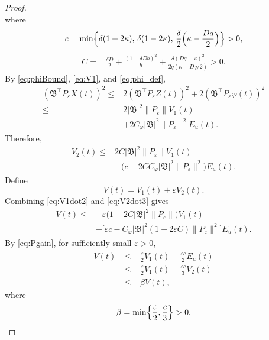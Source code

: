 \documentclass{IEEEtran}
\theoremstyle{definition}
\begin{document}
\begin{proof}
\begin{equation}
\label{eq:V2dot2}
\end{equation}
where
\begin{equation}
\begin{aligned}
 c=\min\Bigl\{\delta(1+2\kappa),\,\delta(1-2\kappa),\,
 \frac\delta2\Bigl(\kappa-\frac{Dq}{2}\Bigr)\Bigr\}>0,
\end{aligned}
\label{eq:constc}
\end{equation}
\begin{equation}
\begin{aligned}
 C={}&\frac{\delta D}{2}+\frac{(1-\delta Db)^2}{b}
 +\frac{\delta(Dq-\kappa)^2}{2q(\kappa-Dq/2)}>0.
\end{aligned}
\label{eq:constC}
\end{equation}
By \eqref{eq:phiBound}, \eqref{eq:V1}, and
\eqref{eq:phi_def},
\begin{equation}
\begin{aligned}
 (\mathfrak B^\top P_\varepsilon X(t))^2
 \leq{}&2(\mathfrak B^\top P_\varepsilon Z(t))^2
      +2(\mathfrak B^\top P_\varepsilon\varphi(t))^2\\
 \leq{}&2|\mathfrak B|^2\|P_\varepsilon\|V_1(t)\\
 &+2C_\varphi|\mathfrak B|^2\|P_\varepsilon\|^2E_u(t).
\end{aligned}
\label{eq:feedbackBound}
\end{equation}
Therefore,
\begin{equation}
\begin{aligned}
\dot V_2(t)\leq{}&2C|\mathfrak B|^2\|P_\varepsilon\|V_1(t)\\
 &-\bigl(c-2CC_\varphi|\mathfrak B|^2\|P_\varepsilon\|^2\bigr)E_u(t).
\end{aligned}
\label{eq:V2dot3}
\end{equation}
Define
\begin{equation}
 V(t)=V_1(t)+\varepsilon V_2(t).
\label{eq:V}
\end{equation}
Combining \eqref{eq:V1dot2} and \eqref{eq:V2dot3} gives
\begin{equation}
\begin{aligned}
\dot V(t)\leq{}&-\varepsilon\bigl(1-2C|\mathfrak B|^2\|P_\varepsilon\|\bigr)V_1(t)\\
 &-\bigl[\varepsilon c-C_\varphi|\mathfrak B|^2
   (1+2\varepsilon C)\|P_\varepsilon\|^2\bigr]E_u(t).
\end{aligned}
\label{eq:Vdot}
\end{equation}
By \eqref{eq:Pgain}, for sufficiently small
$\varepsilon>0$,
\begin{equation}
\begin{aligned}
 \dot V(t)&\leq-\frac\varepsilon2V_1(t)
                  -\frac{\varepsilon c}2E_u(t)\\
 &\leq-\frac\varepsilon2V_1(t)
                  -\frac{\varepsilon c}3V_2(t)\\
 &\leq-\beta V(t),
\end{aligned}
\label{eq:Vdecay}
\end{equation}
where
\begin{equation}
 \beta=\min\Bigl\{\frac\varepsilon2,\frac c3\Bigr\}>0.
\label{eq:beta}
\end{equation}


\end{proof}
\end{document}
